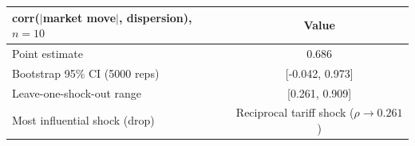 \begin{tabular}{lc}
\toprule
corr($|$market move$|$, dispersion), $n=10$ & Value \\
\midrule
Point estimate & 0.686 \\
Bootstrap 95\% CI (5000 reps) & [-0.042, 0.973] \\
Leave-one-shock-out range & [0.261, 0.909] \\
Most influential shock (drop) & Reciprocal tariff shock ($\rho\!\to\!0.261$) \\
\bottomrule
\end{tabular}